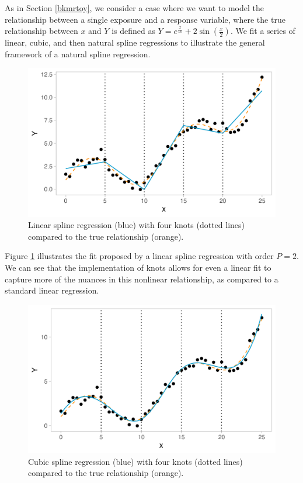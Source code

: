 \documentclass[12pt, twoside]{amherstthesis}
\begin{document}
As in Section \ref{bkmrtoy}, we consider a case where we want to model the relationship between a single exposure and a response variable, where the true relationship between \(x\) and \(Y\) is defined as \(Y = e^{\frac{x}{10}} + 2\sin(\frac{x}{2})\). We fit a series of linear, cubic, and then natural spline regressions to illustrate the general framework of a natural spline regression.
\begin{figure}

{\centering \includegraphics[width=0.75\linewidth]{figures/ch3_toy4} 

}

\caption{Linear spline regression (blue) with four knots (dotted lines) compared to the true relationship (orange).}\label{fig:toy4}
\end{figure}
Figure \ref{fig:toy4} illustrates the fit proposed by a linear spline regression with order \(P=2\). We can see that the implementation of knots allows for even a linear fit to capture more of the nuances in this nonlinear relationship, as compared to a standard linear regression.
\begin{figure}

{\centering \includegraphics[width=0.75\linewidth]{figures/ch3_toy5} 

}

\caption{Cubic spline regression (blue) with four knots (dotted lines) compared to the true relationship (orange).}\label{fig:toy5}
\end{figure}
\end{document}
